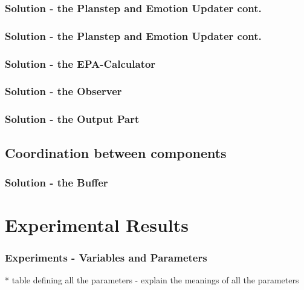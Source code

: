 \documentclass{beamer}
\begin{document}
\begin{frame}
\frametitle{Solution - the Planstep and Emotion Updater cont.}
\end{frame}

\begin{frame}
\frametitle{Solution - the Planstep and Emotion Updater cont.}
\end{frame}

\begin{frame}
\frametitle{Solution - the EPA-Calculator}
\end{frame}

\begin{frame}
\frametitle{Solution - the Observer}
\end{frame}

\begin{frame}
\frametitle{Solution - the Output Part}
\end{frame}

\subsection{Coordination between components}
\begin{frame}
\frametitle{Solution - the Buffer}
\end{frame}

\section{Experimental Results}
\begin{frame}
\frametitle{Experiments - Variables and Parameters}
  * table defining all the parameters - explain the meanings of all the parameters
\end{frame}
\end{document}
